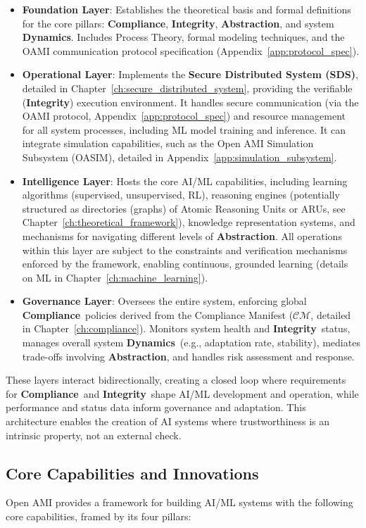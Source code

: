 \documentclass[12pt,a4paper]{report}
\newcommand{\Compliance}{\textbf{Compliance}}
\newcommand{\Integrity}{\textbf{Integrity}}
\newcommand{\Abstraction}{\textbf{Abstraction}}
\newcommand{\Dynamics}{\textbf{Dynamics}}
\begin{document}
	\begin{itemize}[leftmargin=*]
		\item \textbf{Foundation Layer}: Establishes the theoretical basis and formal definitions for the core pillars: \Compliance, \Integrity, \Abstraction, and system \Dynamics. Includes Process Theory, formal modeling techniques, and the OAMI communication protocol specification (Appendix~\ref{app:protocol_spec}).
		\item \textbf{Operational Layer}: Implements the \textbf{Secure Distributed System (SDS)}, detailed in Chapter~\ref{ch:secure_distributed_system}, providing the verifiable (\Integrity) execution environment. It handles secure communication (via the OAMI protocol, Appendix~\ref{app:protocol_spec}) and resource management for all system processes, including ML model training and inference. It can integrate simulation capabilities, such as the Open AMI Simulation Subsystem (OASIM), detailed in Appendix~\ref{app:simulation_subsystem}.
		\item \textbf{Intelligence Layer}: Hosts the core AI/ML capabilities, including learning algorithms (supervised, unsupervised, RL), reasoning engines (potentially structured as directories (graphs) of Atomic Reasoning Units or ARUs, see Chapter~\ref{ch:theoretical_framework}), knowledge representation systems, and mechanisms for navigating different levels of \Abstraction. All operations within this layer are subject to the constraints and verification mechanisms enforced by the framework, enabling continuous, grounded learning (details on ML in Chapter~\ref{ch:machine_learning}).
		\item \textbf{Governance Layer}: Oversees the entire system, enforcing global \Compliance\ policies derived from the Compliance Manifest ($\mathcal{CM}$, detailed in Chapter~\ref{ch:compliance}). Monitors system health and \Integrity\ status, manages overall system \Dynamics\ (e.g., adaptation rate, stability), mediates trade-offs involving \Abstraction, and handles risk assessment and response.
	\end{itemize}
	
	These layers interact bidirectionally, creating a closed loop where requirements for \Compliance\ and \Integrity\ shape AI/ML development and operation, while performance and status data inform governance and adaptation. This architecture enables the creation of AI systems where trustworthiness is an intrinsic property, not an external check.
	
	\subsection{Core Capabilities and Innovations}
	Open AMI provides a framework for building AI/ML systems with the following core capabilities, framed by its four pillars:
	
\end{document}
